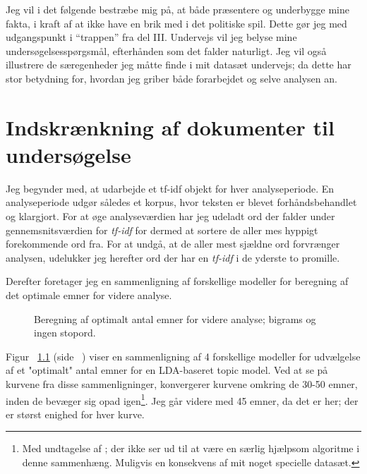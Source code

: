 Jeg vil i det følgende bestræbe mig på, at både præsentere og underbygge mine fakta, i kraft af at ikke have en brik med i det politiske spil.
Dette gør jeg med udgangspunkt i “trappen” fra del III.
Undervejs vil jeg belyse mine undersøgelsesspørgsmål, efterhånden som det falder naturligt.
Jeg vil også illustrere de særegenheder jeg måtte finde i mit datasæt undervejs; da dette har stor betydning for, hvordan jeg griber både forarbejdet og selve analysen an.

\chapter{Indskrænkning af dokumenter til undersøgelse}

Jeg begynder med, at udarbejde et tf-idf objekt for hver analyseperiode.
En analyseperiode udgør således et korpus, hvor teksten er blevet forhåndsbehandlet og klargjort.
For at øge analyseværdien har jeg udeladt ord der falder under gennemsnitsværdien for \textit{tf-idf} for dermed at sortere de aller mes hyppigt forekommende ord fra.
For at undgå, at de aller mest sjældne ord forvrænger analysen, udelukker jeg herefter ord der har en \textit{tf-idf} i de yderste to promille.

Derefter foretager jeg en sammenligning af forskellige modeller for beregning af det optimale emner for videre analyse.

\begin{figure}

\caption{Beregning af optimalt antal emner for videre analyse; bigrams og ingen stopord.}
\label{fig:modelsFull}
\end{figure}

Figur ~\ref{fig:modelsFull} (side ~\pageref{fig:modelsFull}) viser en sammenligning af 4 forskellige modeller for udvælgelse af et "optimalt" antal emner for en LDA-baseret topic model.
Ved at se på kurvene fra disse sammenligninger, konvergerer kurvene omkring de 30-50 emner, inden de bevæger sig opad igen\footnote{Med undtagelse af \autocite{deveaudAccurateEffectiveLatent2014}; der ikke ser ud til at være en særlig hjælpsom algoritme i denne sammenhæng. Muligvis en konsekvens af mit noget specielle datasæt.}.
Jeg går videre med 45 emner, da det er her; der er størst enighed for hver kurve.

